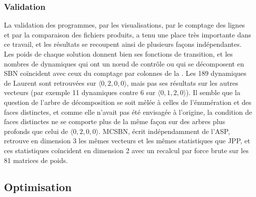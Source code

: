 \documentclass[12pt, a4paper]{article}
\begin{document}
\subsubsection{Validation}

La validation des programmes, par les visualisations, par le comptage des lignes et par la comparaison des fichiers produits, a tenu une place très importante dans ce travail, et les résultats se recoupent ainsi de plusieurs façons indépendantes.
Les poids de chaque solution donnent bien ses fonctions de transition, et les nombres de dynamiques qui ont un nœud de contrôle ou qui se décomposent en SBN coïncident avec ceux du comptage par colonnes de la .
Les 189 dynamiques de Laurent sont retrouvées sur $\langle 0,2,0,0\rangle$, mais pas ses résultats sur les autres vecteurs (par exemple 11 dynamiques contre 6 sur $\langle 0,1,2,0\rangle$).
Il semble que la question de l'arbre de décomposition se soit mêlée à celles de l'énumération et des faces distinctes, et comme elle n'avait pas été envisagée à l'origine, la condition de faces distinctes ne se comporte plus de la même façon sur des arbres plus profonds que celui de $\langle 0,2,0,0\rangle$.
MCSBN, écrit indépendamment de l'ASP, retrouve en dimension 3 les mêmes vecteurs et les mêmes statistiques que JPP, et ces statistiques coïncident en dimension 2 avec un recalcul par force brute sur les 81 matrices de poids.

\subsection{Optimisation}
\label{sec:optimisation}
\end{document}
